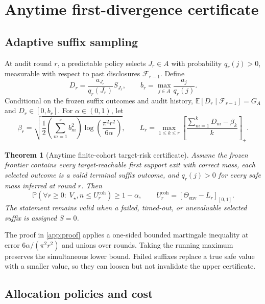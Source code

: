 \documentclass{article}
\newcommand{\E}{\mathbb{E}}
\newcommand{\Prob}{\mathbb{P}}
\newcommand{\Vstar}{V_\star}
\newcommand{\Thetaenv}{\Theta_{\mathrm{env}}}
\newcommand{\Ucoh}{U^{\mathrm{coh}}}
\newcommand{\F}{\mathcal{F}}
\newtheorem{theorem}{Theorem}
\begin{document}
\section{Anytime first-divergence certificate}
\label{sec:certificate}

\subsection{Adaptive suffix sampling}

At audit round $r$, a predictable policy selects $J_r\in A$ with probability
$q_r(j)>0$, measurable with respect to past disclosures $\F_{r-1}$. Define
\begin{equation}
  D_r=\frac{a_{J_r}}{q_r(J_r)}S_{J_r},
  \qquad
  b_r=\max_{j\in A}\frac{a_j}{q_r(j)}.
  \label{eq:importance-safe}
\end{equation}
Conditional on the frozen suffix outcomes and audit history,
$\E[D_r\mid\F_{r-1}]=G_A$ and $D_r\in[0,b_r]$. For $\alpha\in(0,1)$, let
\begin{equation}
  \beta_r=\sqrt{\frac{1}{2}\left(\sum_{m=1}^{r}b_m^2\right)
  \log\!\left(\frac{\pi^2r^2}{6\alpha}\right)},
  \qquad
  L_r=\max_{1\leq k\leq r}
  \left[\frac{\sum_{m=1}^{k}D_m-\beta_k}{k}\right]_+.
  \label{eq:lcb}
\end{equation}

\begin{theorem}[Anytime finite-cohort target-risk certificate]
\label{thm:anytime}
Assume the frozen frontier contains every target-reachable first support exit with correct mass,
each selected outcome is a valid terminal suffix outcome, and $q_r(j)>0$ for every safe mass
inferred at round $r$. Then
\begin{equation}
  \Prob\!\left(\forall r\geq 0:\;
  \Vstar,n\leq \Ucoh_r\right)\geq 1-\alpha,
  \qquad
  \Ucoh_r=\left[\Thetaenv-L_r\right]_{[0,1]}.
  \label{eq:certificate}
\end{equation}
The statement remains valid when a failed, timed-out, or unevaluable selected suffix is assigned
$S=0$.
\end{theorem}

The proof in \cref{app:proof} applies a one-sided bounded martingale inequality at error
$6\alpha/(\pi^2r^2)$ and unions over rounds. Taking the running maximum preserves the simultaneous
lower bound. Failed suffixes replace a true safe value with a smaller value, so they can loosen but
not invalidate the upper certificate.

\subsection{Allocation policies and cost}
\end{document}
